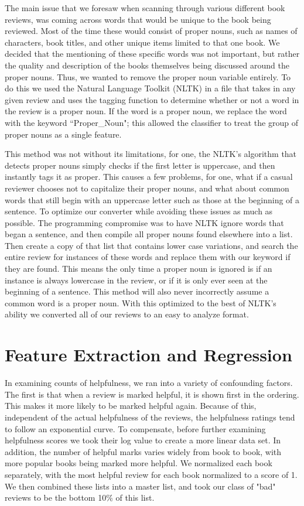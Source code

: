 \documentclass[twocolumn]{article}
\begin{document}
The main issue that we foresaw when scanning through various different book reviews, was
coming across words that would be unique to the book being reviewed. Most of the time these would 
consist of proper nouns, such as names of characters, book titles, and other unique items limited to that 
one book. We decided that the mentioning of these specific words was not important, but rather the 
quality and description of the books themselves being discussed around the proper nouns. Thus, we 
wanted to remove the proper noun variable entirely. To do this we used the Natural Language Toolkit 
(NLTK) in a file that takes in any given review and uses the tagging function to determine whether or not 
a word in the review is a proper noun. If the word is a proper noun, we replace the word with the 
keyword “Proper\_Noun"; this allowed the classifier to treat the group of proper nouns as a single feature. 
 
This method was not without its limitations, for one, the NLTK’s algorithm that detects proper 
nouns simply checks if the first letter is uppercase, and then instantly tags it as proper. This causes a few problems, for one, what if a casual reviewer chooses not to capitalize their proper nouns, and what 
about common words that still begin with an uppercase letter such as those at the beginning of a 
sentence. To optimize our converter while avoiding these issues as much as possible. The programming 
compromise was to have NLTK ignore words that began a sentence, and then compile all proper nouns 
found elsewhere into a list. Then create a copy of that list that contains lower case variations, and 
search the entire review for instances of these words and replace them with our keyword if they are 
found. This means the only time a proper noun is ignored is if an instance is always lowercase in the 
review, or if it is only ever seen at the beginning of a sentence. This method will also never incorrectly 
assume a common word is a proper noun. With this optimized to the best of NLTK’s ability we converted 
all of our reviews to an easy to analyze format.

\section{Feature Extraction and Regression}

In examining counts of helpfulness, we ran into a variety of confounding factors. The first is that when a review is marked helpful, it is shown first in the ordering. This makes it more likely to be marked helpful again. Because of this, independent of the actual helpfulness of the reviews, the helpfulness ratings tend to follow an exponential curve. To compensate, before further examining helpfulness scores we took their log value to create a more linear data set. In addition, the number of helpful marks varies widely from book to book, with more popular books being marked more helpful. We normalized each book separately, with the most helpful review for each book normalized to a score of 1. We then combined these lists into a master list, and took our class of "bad" reviews to be the bottom 10\% of this list.
\end{document}
